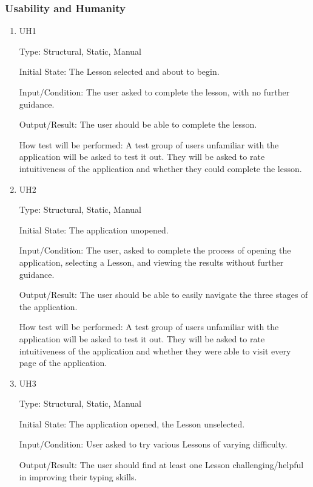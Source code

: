\documentclass[12pt, titlepage]{article}
\begin{document}
\subsubsection{Usability and Humanity}
\begin{enumerate}

\item{{\color{cyan}UH1}\\}

Type: Structural, Static, Manual
					
Initial State: The Lesson selected and about to begin.
					
Input/Condition: The user asked to complete the lesson, with no further guidance.
					
Output/Result: The user should be able to complete the lesson.
					
How test will be performed: A test group of users unfamiliar with the application will be asked to test it out.{\color{cyan} They will be asked to rate intuitiveness of the application and whether they could complete the lesson.}

\item{{\color{cyan}UH2}\\}

Type: Structural, Static, Manual
					
Initial State: The application unopened.
					
Input/Condition: The user, asked to complete the process of opening the application, selecting a Lesson, and viewing the results without further guidance.
					
Output/Result: The user should be able to easily navigate the three stages of the application.
					
How test will be performed:  A test group of users unfamiliar with the application will be asked to test it out.{\color{cyan} They will be asked to rate intuitiveness of the application and whether they were able to visit every page of the application.}

\item{{\color{cyan}UH3}\\}

Type: Structural, Static, Manual
					
Initial State: The application opened, the Lesson unselected.
					
Input/Condition: User asked to try various Lessons of varying difficulty.
					
Output/Result: The user should find at least one Lesson challenging/helpful in improving their typing skills.
					

\end{enumerate}
\end{document}
